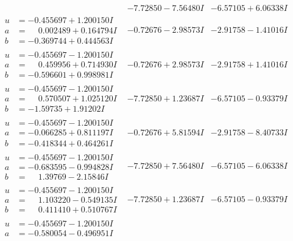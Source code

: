 \documentclass[1p]{elsarticle_modified}
\theoremstyle{definition}
\begin{document}
$$\begin{array}{c|c|c}
 & -7.72850 - 7.56480 I & -6.57105 + 6.06338 I \\ \hline\begin{aligned}
u &= -0.455697 + 1.200150 I \\
a &= \phantom{-}0.002489 + 0.164794 I \\
b &= -0.369744 + 0.444563 I\end{aligned}
 & -0.72676 - 2.98573 I & -2.91758 - 1.41016 I \\ \hline\begin{aligned}
u &= -0.455697 - 1.200150 I \\
a &= \phantom{-}0.459956 + 0.714930 I \\
b &= -0.596601 + 0.998981 I\end{aligned}
 & -0.72676 + 2.98573 I & -2.91758 + 1.41016 I \\ \hline\begin{aligned}
u &= -0.455697 - 1.200150 I \\
a &= \phantom{-}0.570507 + 1.025120 I \\
b &= -1.59735 + 1.91202 I\end{aligned}
 & -7.72850 + 1.23687 I & -6.57105 - 0.93379 I \\ \hline\begin{aligned}
u &= -0.455697 - 1.200150 I \\
a &= -0.066285 + 0.811197 I \\
b &= -0.418344 + 0.464261 I\end{aligned}
 & -0.72676 + 5.81594 I & -2.91758 - 8.40733 I \\ \hline\begin{aligned}
u &= -0.455697 - 1.200150 I \\
a &= -0.683595 - 0.994828 I \\
b &= \phantom{-}1.39769 - 2.15846 I\end{aligned}
 & -7.72850 + 7.56480 I & -6.57105 - 6.06338 I \\ \hline\begin{aligned}
u &= -0.455697 - 1.200150 I \\
a &= \phantom{-}1.103220 - 0.549135 I \\
b &= \phantom{-}0.411410 + 0.510767 I\end{aligned}
 & -7.72850 + 1.23687 I & -6.57105 - 0.93379 I \\ \hline\begin{aligned}
u &= -0.455697 - 1.200150 I \\
a &= -0.580054 - 0.496951 I \\

\end{aligned}
\end{array}$$
\end{document}
